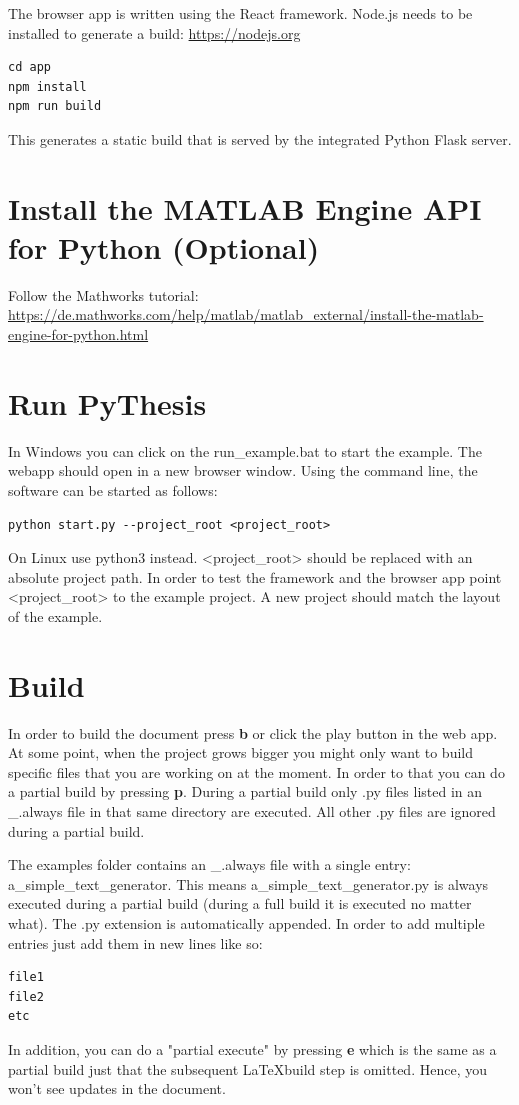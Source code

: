 \documentclass[a4paper]{book}
\begin{document}
The browser app is written using the React framework. Node.js needs to be installed to generate a build: \url{https://nodejs.org} 
\begin{verbatim}
cd app
npm install
npm run build
\end{verbatim}
This generates a static build that is served by the integrated Python Flask server.  
\section{Install the MATLAB Engine API for Python (Optional)}
Follow the Mathworks tutorial: \url{https://de.mathworks.com/help/matlab/matlab_external/install-the-matlab-engine-for-python.html}

\section{Run PyThesis}
In Windows you can click on the run\_example.bat to start the example. The webapp should open in a new browser window. Using the command line, the software can be started as follows: 
\begin{verbatim}
python start.py --project_root <project_root>
\end{verbatim}
On Linux use python3 instead. <project\_root> should be replaced with an absolute project path. In order to test the framework and the browser app point <project\_root> to the example project. A new project should match the layout of the example.


\section{Build}
\label{sec:build}
In order to build the document press \textbf{b} or click the play button in the web app. At some point, when the project grows bigger you might only want to build specific files that you are working on at the moment. In order to that you can do a partial build by pressing \textbf{p}. During a partial build only .py files listed in an \_.always file in that same directory are executed. All other .py files are ignored during a partial build. 

The examples folder contains an \_.always file with a single entry: a\_simple\_text\_generator. This means a\_simple\_text\_generator.py is always executed during a partial build (during a full build it is executed no matter what). The .py extension is automatically appended. In order to add multiple entries just add them in new lines like so:
\begin{verbatim}
file1
file2
etc
\end{verbatim}
In addition, you can do a "partial execute" by pressing \textbf{e} which is the same as a partial build just that the subsequent \LaTeX build step is omitted. Hence, you won't see updates in the document. 
\end{document}
